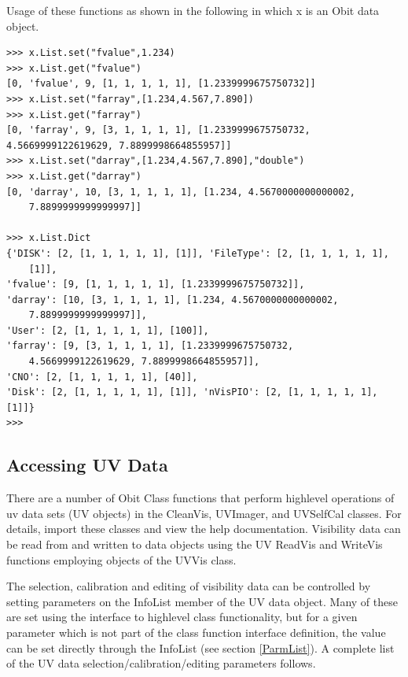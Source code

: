\documentclass[11pt]{report}
\begin{document}
Usage of these functions as shown in the following in which x is an Obit data
object.
\begin{verbatim}
>>> x.List.set("fvalue",1.234)
>>> x.List.get("fvalue")
[0, 'fvalue', 9, [1, 1, 1, 1, 1], [1.2339999675750732]]
>>> x.List.set("farray",[1.234,4.567,7.890])
>>> x.List.get("farray")
[0, 'farray', 9, [3, 1, 1, 1, 1], [1.2339999675750732, 4.5669999122619629, 7.8899998664855957]]
>>> x.List.set("darray",[1.234,4.567,7.890],"double")
>>> x.List.get("darray")
[0, 'darray', 10, [3, 1, 1, 1, 1], [1.234, 4.5670000000000002,
    7.8899999999999997]]

>>> x.List.Dict
{'DISK': [2, [1, 1, 1, 1, 1], [1]], 'FileType': [2, [1, 1, 1, 1, 1],
    [1]], 
'fvalue': [9, [1, 1, 1, 1, 1], [1.2339999675750732]], 
'darray': [10, [3, 1, 1, 1, 1], [1.234, 4.5670000000000002,
    7.8899999999999997]], 
'User': [2, [1, 1, 1, 1, 1], [100]], 
'farray': [9, [3, 1, 1, 1, 1], [1.2339999675750732,
    4.5669999122619629, 7.8899998664855957]], 
'CNO': [2, [1, 1, 1, 1, 1], [40]], 
'Disk': [2, [1, 1, 1, 1, 1], [1]], 'nVisPIO': [2, [1, 1, 1, 1, 1], [1]]}
>>> 
\end{verbatim}

\subsection{Accessing UV Data \label {UVData}}
There are a number of Obit Class functions that perform highlevel
operations of uv data sets (UV objects) in the CleanVis, 
UVImager, and UVSelfCal classes.
For details, import these classes and view the help documentation.
Visibility data can be read from and written to data objects using the
UV ReadVis and WriteVis functions employing objects of the UVVis
class.

The selection, calibration and editing of visibility data can be
controlled by setting parameters on the InfoList member of the UV data
object. 
Many of these are set using the interface to highlevel class
functionality, but for a given parameter which is not part of the
class function interface definition, the value can be set directly
through the InfoList (see section \ref{ParmList}).
A complete list of the UV data selection/calibration/editing
parameters follows. 
\end{document}
